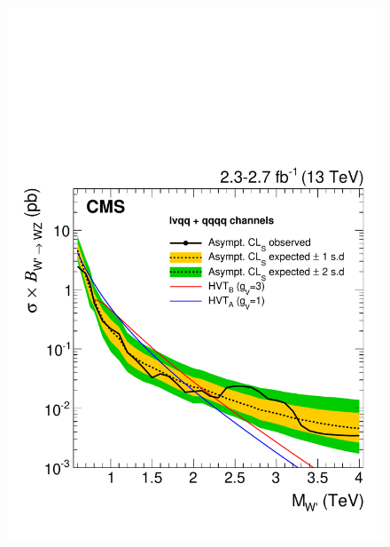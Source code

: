 \begin{figure}[!htb]
     \includegraphics[width=\cmsFigWidth]{B2G-16-004/Figure_006-b.pdf}\\

\end{figure}
